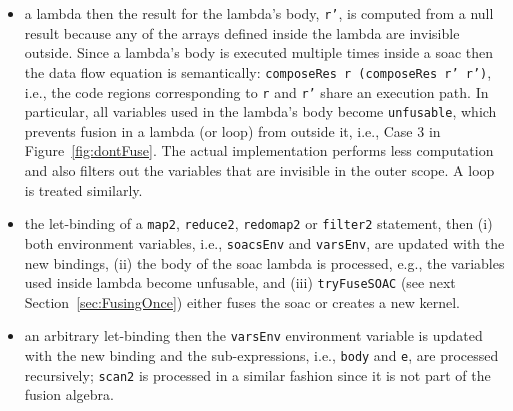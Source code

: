 \documentclass{sigplanconf}  %
\newcommand{\emp}[1]{\textcolor{DikuRed}{ #1}}
\begin{document}
\begin{itemize}
          \item a lambda then the result for the lambda's body, {\tt r'}, 
            is computed from a null result because any of the
            arrays defined inside the lambda are invisible outside.
            Since a lambda's body is executed multiple times inside a
            {\sc soac} then the data flow equation is semantically:
            {\tt composeRes r (composeRes r' r')}, i.e., the code
            regions corresponding to {\tt r} and {\tt r'} share an
            execution path.  In particular, all variables used in
            the lambda's body become {\tt unfusable}, which prevents
            fusion in a lambda (or loop) from outside it, i.e., 
            \emp{Case 3} in Figure~\ref{fig:dontFuse}.
            The actual implementation performs less computation and also
            filters out the variables that are invisible in the outer scope.
            A loop is treated similarly.
    \item  the let-binding of a {\tt map2}, {\tt reduce2}, {\tt redomap2} or {\tt filter2} 
            statement, then (i) both environment variables, i.e., {\tt soacsEnv} and {\tt varsEnv}, 
            are updated with the new bindings, (ii) the body of the {\sc soac} 
            lambda is processed, e.g., the variables used inside lambda become unfusable,
            and (iii) \emp{{\tt tryFuseSOAC}} 
            (see next Section~\ref{sec:FusingOnce}) either fuses the {\sc soac} 
            or creates a new kernel. 
    \item an arbitrary let-binding then the {\tt varsEnv} environment variable is
            updated with the new binding and the sub-expressions, i.e., {\tt body} 
            and {\tt e}, are processed recursively; {\tt scan2} is processed
            in a similar fashion since it is not part of the fusion algebra. 
\end{itemize}
\end{document}
